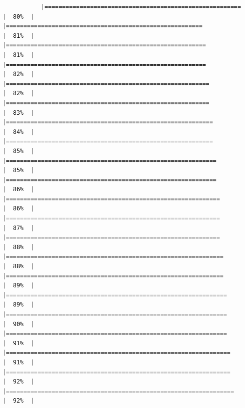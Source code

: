 \documentclass[
]{article}
\begin{document}
\begin{verbatim}
           |========================================================              |  80%  |                                                                              |========================================================              |  81%  |                                                                              |=========================================================             |  81%  |                                                                              |=========================================================             |  82%  |                                                                              |==========================================================            |  82%  |                                                                              |==========================================================            |  83%  |                                                                              |===========================================================           |  84%  |                                                                              |===========================================================           |  85%  |                                                                              |============================================================          |  85%  |                                                                              |============================================================          |  86%  |                                                                              |=============================================================         |  86%  |                                                                              |=============================================================         |  87%  |                                                                              |=============================================================         |  88%  |                                                                              |==============================================================        |  88%  |                                                                              |==============================================================        |  89%  |                                                                              |===============================================================       |  89%  |                                                                              |===============================================================       |  90%  |                                                                              |===============================================================       |  91%  |                                                                              |================================================================      |  91%  |                                                                              |================================================================      |  92%  |                                                                              |=================================================================     |  92%  |                                                                    
\end{verbatim}
\end{document}
